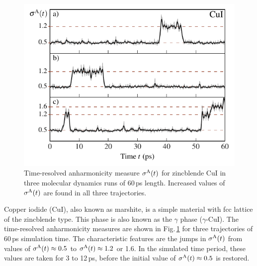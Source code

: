 \begin{figure}
	\includegraphics[width=\textwidth]{./data/plots/defects/216.02.CuI/sigma_vs_time.pdf}
	\caption{Time-resolved anharmonicity measure $\sigma^\mathrm{A} (t)$ for zincblende CuI in three molecular dynamics runs of 60\,ps length. Increased values of $\sigma^\mathrm{A} (t)$ are found in all three trajectories.}
	\label{fig:defects.CuI}
\end{figure}
%
%
Copper iodide (CuI), also known as marshite, is a simple material with fcc lattice of the zincblende type. This phase is also known as the $\gamma$ phase ($\gamma$-CuI).
The time-resolved anharmonicity measures are shown in Fig.\,\ref{fig:defects.CuI} for three trajectories of 60\,ps simulation time.
The characteristic features are the jumps in $\sigma^\mathrm{A} (t)$ from values of $\sigma^\mathrm{A} (t) \approx 0.5$ to $\sigma^\mathrm{A} (t) \approx 1.2$ or 1.6. In the simulated time period, these values are taken for 3 to 12\,ps, before the initial value of $\sigma^\mathrm{A} (t) \approx 0.5$ is restored. 
%
